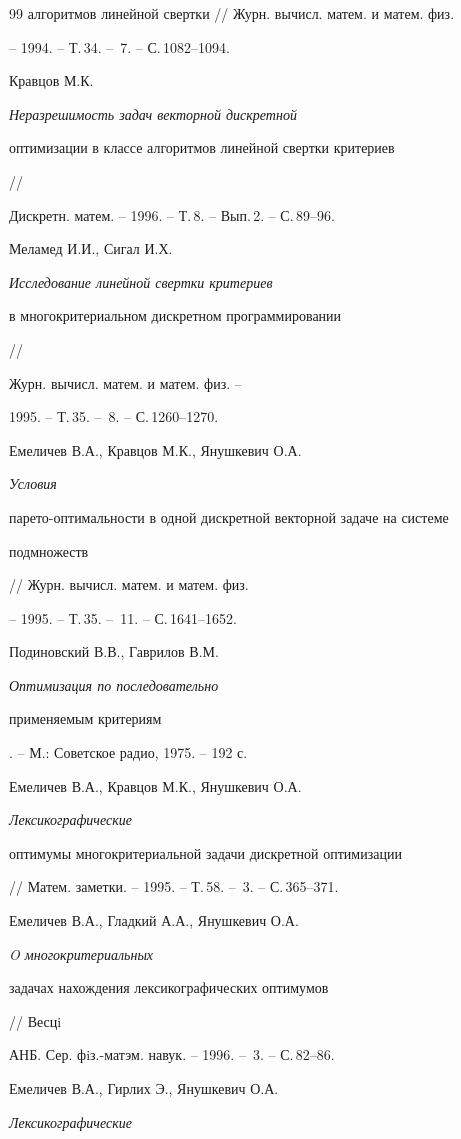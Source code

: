 \begin{thebibliography}{99}
{алгоритмов линейной свертки} // Журн. вычисл. матем. и матем. физ. 


-- 1994. -- Т.\,34. -- \No\,7. -- С.\,1082--1094. 




Кравцов М.К. {\em Неразрешимость задач векторной дискретной 


оптимизации в классе алгоритмов линейной свертки критериев} // 


Дискретн. матем. -- 1996. -- Т.\,8. -- Вып.\,2. -- С.\,89--96. 




Меламед И.И., Сигал И.Х. {\em Исследование линейной свертки критериев 


в многокритериальном дискретном программировании} // 


Журн. вычисл. матем. и матем. физ. -- 


1995. -- Т.\,35. -- \No\,8. -- С.\,1260--1270. 




Емеличев В.А., Кравцов М.К., Янушкевич О.А. {\em Условия 


парето-оптимальности в одной дискретной векторной задаче на системе 


подмножеств}// Журн. вычисл. матем. и матем. физ. 


-- 1995. -- Т.\,35. -- \No\,11. -- С.\,1641--1652. 




Подиновский В.В., Гаврилов В.М. {\em Оптимизация по последовательно 


применяемым критериям}. -- М.: Советское радио, 1975. -- 192 с. 




Емеличев В.А., Кравцов М.К., Янушкевич О.А. {\em Лексикографические 


оптимумы многокритериальной задачи дискретной оптимизации} 


// Матем. заметки. -- 1995. -- Т.\,58. -- \No\,3. -- С.\,365--371. 




Емеличев В.А., Гладкий А.А., Янушкевич О.А. {\em O многокритериальных 


задачах нахождения лексикографических оптимумов} // Весцi 


АНБ. Сер. фiз.-матэм. навук. -- 1996. -- \No\,3. -- С.\,82--86. 




Емеличев В.А., Гирлих Э., Янушкевич О.А. {\em Лексикографические 


}
\end{thebibliography}
